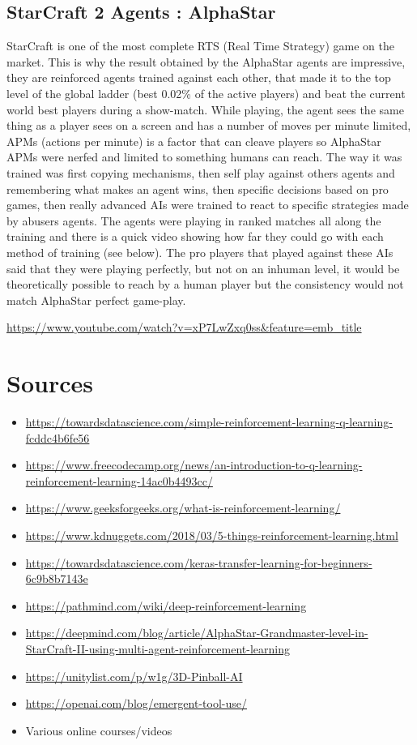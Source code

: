 \documentclass[a4paper,12pt,calibri,oneside,openany]{book}
\theoremstyle{break}
\begin{document}
\section{StarCraft 2 Agents : AlphaStar}
\qquad StarCraft is one of the most complete RTS (Real Time Strategy) game on the market. This is why the result obtained by the AlphaStar agents are impressive, they are reinforced agents trained against each other, that made it to the top level of the global ladder (best 0.02\% of the active players) and beat the current world best players during a show-match. While playing, the agent sees the same thing as a player sees on a screen and has a number of moves per minute limited, APMs (actions per minute) is a factor that can cleave players so AlphaStar APMs were nerfed and limited to something humans can reach. The way it was trained was first copying mechanisms, then self play against others agents and remembering what makes an agent wins, then specific decisions based on pro games, then really advanced AIs were trained to react to specific strategies made by abusers agents. The agents were playing in ranked matches all along the training and there is a quick video showing how far they could go with each method of training (see below). The pro players that played against these AIs said that they were playing perfectly, but not on an inhuman level, it would be theoretically possible to reach by a human player but the consistency would not match AlphaStar perfect game-play. 

\url{https://www.youtube.com/watch?v=xP7LwZxq0ss&feature=emb_title}

\clearpage
\chapter*{Sources}
\begin{itemize}
	\footnotesize
	\item\url{https://towardsdatascience.com/simple-reinforcement-learning-q-learning-fcddc4b6fe56}
	\item\url{https://www.freecodecamp.org/news/an-introduction-to-q-learning-reinforcement-learning-14ac0b4493cc/}
	\item\url{https://www.geeksforgeeks.org/what-is-reinforcement-learning/}
	\item\url{https://www.kdnuggets.com/2018/03/5-things-reinforcement-learning.html}
	\item\url{https://towardsdatascience.com/keras-transfer-learning-for-beginners-6c9b8b7143e}
	\item\url{https://pathmind.com/wiki/deep-reinforcement-learning}
	\item\url{https://deepmind.com/blog/article/AlphaStar-Grandmaster-level-in-StarCraft-II-using-multi-agent-reinforcement-learning}
	\item\url{https://unitylist.com/p/w1g/3D-Pinball-AI}
	\item\url{https://openai.com/blog/emergent-tool-use/}
    \item Various online courses/videos 
    
\end{itemize}
\end{document}

